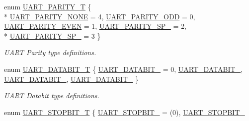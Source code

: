 \begin{DoxyCompactItemize}
\item 
enum \hyperlink{class_c_serial_ad38b0926868c6cfabb59e2da94f1cf40}{U\-A\-R\-T\-\_\-\-P\-A\-R\-I\-T\-Y\-\_\-\-T} \{ \\*
\hyperlink{class_c_serial_ad38b0926868c6cfabb59e2da94f1cf40a77e567bbd57497e51b0161ed1cd855a4}{U\-A\-R\-T\-\_\-\-P\-A\-R\-I\-T\-Y\-\_\-\-N\-O\-N\-E} = 4, 
\hyperlink{class_c_serial_ad38b0926868c6cfabb59e2da94f1cf40aa157a4ef710e04651e3aaf61a4d96ad9}{U\-A\-R\-T\-\_\-\-P\-A\-R\-I\-T\-Y\-\_\-\-O\-D\-D} = 0, 
\hyperlink{class_c_serial_ad38b0926868c6cfabb59e2da94f1cf40a4b7452e8ef848287eca86b7ea4411e65}{U\-A\-R\-T\-\_\-\-P\-A\-R\-I\-T\-Y\-\_\-\-E\-V\-E\-N} = 1, 
\hyperlink{class_c_serial_ad38b0926868c6cfabb59e2da94f1cf40a20c9bc3b3fa95b78898159cd2680e007}{U\-A\-R\-T\-\_\-\-P\-A\-R\-I\-T\-Y\-\_\-\-S\-P\-\_} = 2, 
\\*
\hyperlink{class_c_serial_ad38b0926868c6cfabb59e2da94f1cf40a660aab6ba15f9c94cc9963ff226a77eb}{U\-A\-R\-T\-\_\-\-P\-A\-R\-I\-T\-Y\-\_\-\-S\-P\-\_} = 3
 \}
\begin{DoxyCompactList}\small\item\em U\-A\-R\-T Parity type definitions. \end{DoxyCompactList}\item 
enum \hyperlink{class_c_serial_a628c8c9be04f0315c4dae70ce8ccc5b3}{U\-A\-R\-T\-\_\-\-D\-A\-T\-A\-B\-I\-T\-\_\-\-T} \{ \hyperlink{class_c_serial_a628c8c9be04f0315c4dae70ce8ccc5b3a7ac317a766becd83f58a2daa007fed1e}{U\-A\-R\-T\-\_\-\-D\-A\-T\-A\-B\-I\-T\-\_} = 0, 
\hyperlink{class_c_serial_a628c8c9be04f0315c4dae70ce8ccc5b3a6c31f7e06c7a6779b6d72d37aba52fb1}{U\-A\-R\-T\-\_\-\-D\-A\-T\-A\-B\-I\-T\-\_}, 
\hyperlink{class_c_serial_a628c8c9be04f0315c4dae70ce8ccc5b3abf533a46435efaddb8e38b9b9fe53eff}{U\-A\-R\-T\-\_\-\-D\-A\-T\-A\-B\-I\-T\-\_}, 
\hyperlink{class_c_serial_a628c8c9be04f0315c4dae70ce8ccc5b3a196b716ca31d23301c1059b53ac35f25}{U\-A\-R\-T\-\_\-\-D\-A\-T\-A\-B\-I\-T\-\_}
 \}
\begin{DoxyCompactList}\small\item\em U\-A\-R\-T Databit type definitions. \end{DoxyCompactList}\item 
enum \hyperlink{class_c_serial_af02af389f5596b7b40cf0d2ece57b04b}{U\-A\-R\-T\-\_\-\-S\-T\-O\-P\-B\-I\-T\-\_\-\-T} \{ \hyperlink{class_c_serial_af02af389f5596b7b40cf0d2ece57b04ba6351eeac6c2e865ed9019323e2491907}{U\-A\-R\-T\-\_\-\-S\-T\-O\-P\-B\-I\-T\-\_} = (0), 
\hyperlink{class_c_serial_af02af389f5596b7b40cf0d2ece57b04bafe7ff299f68959471436234643298e71}{U\-A\-R\-T\-\_\-\-S\-T\-O\-P\-B\-I\-T\-\_}

\end{DoxyCompactItemize}
